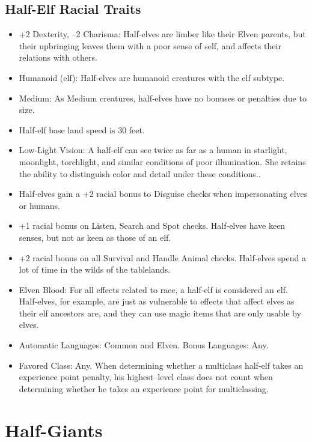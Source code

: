 \documentclass[10pt,a4paper,twocolumn]{d20}
\begin{document}
\subsection{Half-Elf Racial Traits}
\begin{itemize}
    \item +2 Dexterity, –2 Charisma: Half‐elves are limber like their Elven parents, but their upbringing leaves them with a poor sense of self, and affects their relations with others.
    \item Humanoid (elf): Half‐elves are humanoid creatures with the elf subtype.
    \item Medium: As Medium creatures, half‐elves have no bonuses or penalties due to size.
    \item Half‐elf base land speed is 30 feet.
    \item Low-Light Vision: A half-elf can see twice as far as a human in starlight, moonlight, torchlight, and similar conditions of poor illumination. She retains the ability to distinguish color and detail under these conditions..
    \item Half‐elves gain a +2 racial bonus to Disguise checks when impersonating elves or humans.
    \item +1 racial bonus on Listen, Search and Spot checks. Half‐elves have keen senses, but not as keen as those of an elf.
    \item +2 racial bonus on all Survival and Handle Animal checks. Half‐elves spend a lot of time in the wilds of the tablelands.
    \item Elven Blood: For all effects related to race, a half‐elf is considered an elf. Half‐elves, for example, are just as vulnerable to effects that affect elves as their elf ancestors are, and they can use magic items that are only usable by elves.
    \item Automatic Languages: Common and Elven. Bonus Languages: Any.
    \item Favored Class: Any. When determining whether a multiclass half‐elf takes an experience point penalty, his highest–level class does not count when determining whether he takes an experience point for multiclassing.
\end{itemize}

\section{Half-Giants}
\end{document}
